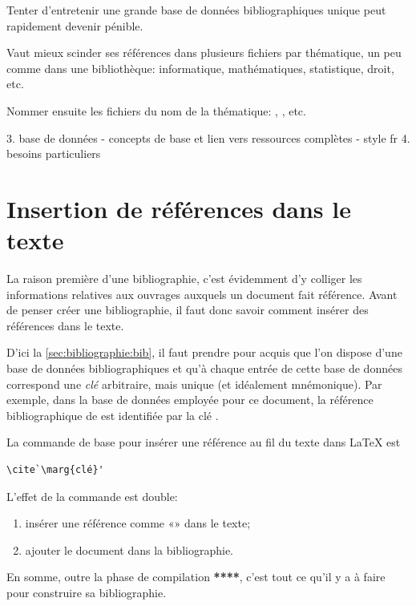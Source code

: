 \begin{conseil}
  Tenter d'entretenir une grande base de données bibliographiques
  unique peut rapidement devenir pénible.

  Vaut mieux scinder ses références dans plusieurs fichiers par
  thématique, un peu comme dans une bibliothèque: informatique,
  mathématiques, statistique, droit, etc.

  Nommer ensuite les fichiers du nom de la thématique:
  , , etc.
\end{conseil}

3. base de données
   - concepts de base et lien vers ressources complètes
   - style fr
4. besoins particuliers




\section{Insertion de références dans le texte}
\label{sec:bibliographie:cite}

La raison première d'une bibliographie, c'est évidemment d'y colliger
les informations relatives aux ouvrages auxquels un document fait
référence. Avant de penser créer une bibliographie, il faut donc
savoir comment insérer des références dans le texte.

D'ici la \autoref{sec:bibliographie:bib}, il faut prendre pour acquis
que l'on dispose d'une base de données bibliographiques et qu'à chaque
entrée de cette base de données correspond une \emph{clé} arbitraire,
mais unique (et idéalement mnémonique). Par exemple, dans la base de
données employée pour ce document, la référence bibliographique de
\citet{Mori:bibliographies:2009} est identifiée par la clé
.

La commande de base pour insérer une référence au fil du texte dans
{\LaTeX} est
\begin{lstlisting}
\cite`\marg{clé}'
\end{lstlisting}
L'effet de la commande est double:
\begin{enumerate}
\item insérer une référence comme «»
  dans le texte;
\item ajouter le document dans la bibliographie.
\end{enumerate}
En somme, outre la phase de compilation \textbf{****}, c'est tout ce
qu'il y a à faire pour construire sa bibliographie.

